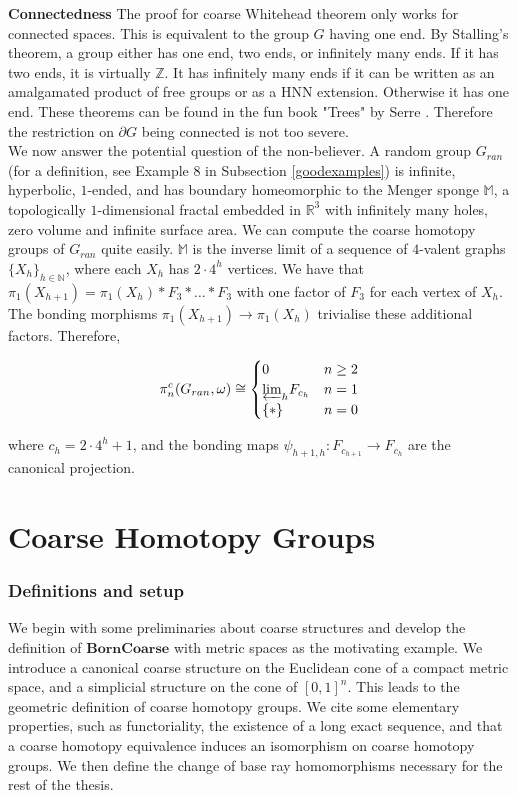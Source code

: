 \documentclass[a4paper,11pt]{article}
\theoremstyle{definition}
\theoremstyle{plain}
\theoremstyle{remark}
\begin{document}
\textbf{Connectedness} The proof for coarse Whitehead theorem only works for connected spaces. This is equivalent to the group $G$ having one end. By Stalling's theorem, a group either has one end, two ends, or infinitely many ends. If it has two ends, it is virtually $\mathbb{Z}$. It has infinitely many ends if it can be written as an amalgamated product of free groups or as a HNN extension. Otherwise it has one end. These theorems can be found in the fun book "Trees" by Serre \cite{serre2002trees}. Therefore the restriction on $\partial G$ being connected is not too severe.\\

We now answer the potential question of the non-believer. A random group $G_{ran}$ (for a definition, see Example 8 in Subsection \ref{goodexamples}) is infinite, hyperbolic, $1$-ended, and has boundary homeomorphic to the Menger sponge $\mathbb{M}$, a topologically $1$-dimensional fractal embedded in $\mathbb{R}^3$ with infinitely many holes, zero volume and infinite surface area. We can compute the coarse homotopy groups of $G_{ran}$ quite easily. $\mathbb{M}$ is the inverse limit of a sequence of $4$-valent graphs $\{X_h\}_{h\in \mathbb{N}}$, where each $X_h$ has $2\cdot 4^h$ vertices. We have that $\pi_1(X_{h+1}) = \pi_{1}(X_h) \ast F_{3}\ast \dots \ast F_{3}$  with one factor of $F_{3}$ for each vertex of $X_{h}$. The bonding morphisms $\pi_{1}(X_{h+1})\rightarrow \pi_{1}(X_h)$ trivialise these additional factors. Therefore,  

\[ \pi_{n}^{c}(G_{ran},\omega) \cong \begin{cases} 
       0 &n\geq 2  \\
        {\varprojlim}_{h}  F_{c_{h}} & n=1 \\ 
        \{\ast\} & n=0\\
       \end{cases}
    \]

where $c_{h} =2\cdot 4^{h}+1$, and the bonding maps $\psi_{h+1,h}: F_{c_{h+1}} \rightarrow F_{c_{h}}$ are the canonical projection.  


\newpage

\part{Coarse Homotopy Groups}

\section{Definitions and setup} We begin with some preliminaries about coarse structures and develop the definition of $\mathbf{BornCoarse}$ with metric spaces as the motivating example. We introduce a canonical coarse structure on the Euclidean cone of a compact metric space, and a simplicial structure on the cone of $[0,1]^n$. This leads to the geometric definition of coarse homotopy groups. We cite some elementary properties, such as functoriality, the existence of a long exact sequence, and that a coarse homotopy equivalence induces an isomorphism on coarse homotopy groups. We then define the change of base ray homomorphisms necessary for the rest of the thesis. 
\end{document}
